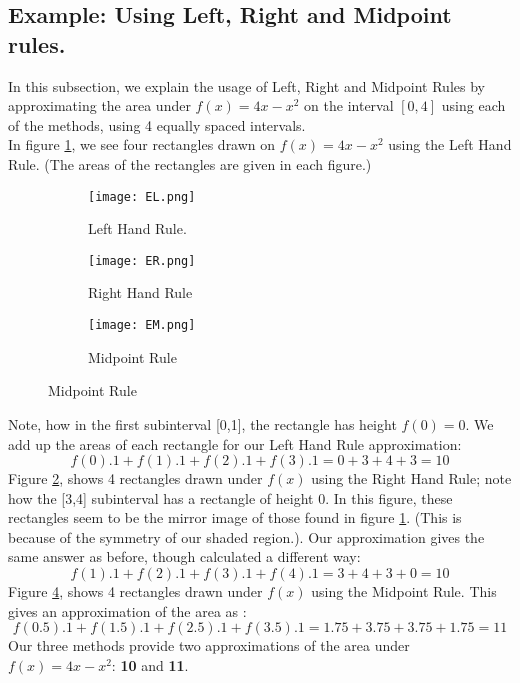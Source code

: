 \documentclass[a4paper, 12pt]{report}
\begin{document}
    \subsection{Example: Using Left, Right and Midpoint rules.}
    In this subsection, we explain the usage of Left, Right and Midpoint Rules by approximating the area under $f(x)=4x-x^{2}$ on the interval $[0,4]$ using each of the methods, using 4 equally spaced intervals.\\
    In figure \ref{fig:EL}, we see four rectangles drawn on $f(x)=4x-x^{2}$ using the Left Hand Rule. (The areas of the rectangles are given in each figure.)
    \begin{figure}[h]
    \centering
    \begin{subfigure}{.55\textwidth}
    \centering
    \texttt{[image: EL.png]}
    \caption{Left Hand Rule.}
    \label{fig:EL}
    \end{subfigure}%
    \begin{subfigure}{.55\textwidth}
    \centering
    \texttt{[image: ER.png]}
    \caption{Right Hand Rule}
    \label{fig:ER}
    \end{subfigure}
    \begin{subfigure}{.6\textwidth}
    \centering
    \texttt{[image: EM.png]}
    \caption{Midpoint Rule}
    \label{fig:EM}
    \end{subfigure}
    \end{figure}
    Note, how in the first subinterval [0,1], the rectangle has height $f(0)=0$. We add up the areas of each rectangle for our Left Hand Rule approximation:
    \begin{equation}
        f(0).1 + f(1).1 + f(2).1 + f(3).1 = 0 + 3 + 4 + 3 = 10
    \end{equation}
    Figure \ref{fig:ER}, shows 4 rectangles drawn under $f(x)$ using the Right Hand Rule; note how the [3,4] subinterval has a rectangle of height 0.
    In this figure, these rectangles seem to be the mirror image of those found in figure \ref{fig:EL}. (This is because of the symmetry of our shaded region.). Our approximation gives the same answer as before, though calculated a different way:
    \begin{equation}
        f(1).1 + f(2).1 + f(3).1 + f(4).1 =  3 + 4 + 3 + 0 = 10
    \end{equation}
    Figure \ref{fig:EM}, shows 4 rectangles drawn under $f(x)$ using the Midpoint Rule.
    This gives an approximation of the area as :
    \begin{equation}
        f(0.5).1 + f(1.5).1 + f(2.5).1 + f(3.5).1 =  1.75 + 3.75 + 3.75 + 1.75 = 11
    \end{equation}
    Our three methods provide two approximations of the area under \textbf{$f(x)=4x-x^{2}$}: \textbf{10} and \textbf{11}.
    
\end{document}
